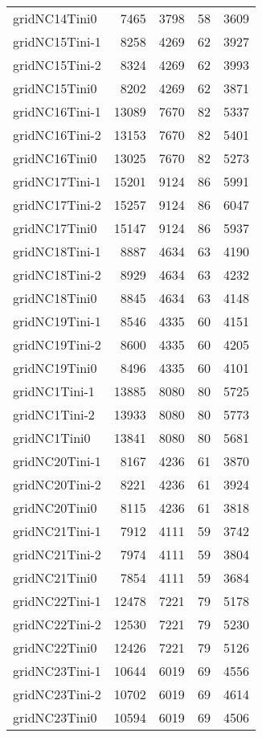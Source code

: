 \documentclass[../../../thesis.tex]{subfiles}
\begin{document}
\begin{longtable}{lrrrr}
gridNC14Tini0 & 7465 & 3798 & 58 & 3609 \\
gridNC15Tini-1 & 8258 & 4269 & 62 & 3927 \\
gridNC15Tini-2 & 8324 & 4269 & 62 & 3993 \\
gridNC15Tini0 & 8202 & 4269 & 62 & 3871 \\
gridNC16Tini-1 & 13089 & 7670 & 82 & 5337 \\
gridNC16Tini-2 & 13153 & 7670 & 82 & 5401 \\
gridNC16Tini0 & 13025 & 7670 & 82 & 5273 \\
gridNC17Tini-1 & 15201 & 9124 & 86 & 5991 \\
gridNC17Tini-2 & 15257 & 9124 & 86 & 6047 \\
gridNC17Tini0 & 15147 & 9124 & 86 & 5937 \\
gridNC18Tini-1 & 8887 & 4634 & 63 & 4190 \\
gridNC18Tini-2 & 8929 & 4634 & 63 & 4232 \\
gridNC18Tini0 & 8845 & 4634 & 63 & 4148 \\
gridNC19Tini-1 & 8546 & 4335 & 60 & 4151 \\
gridNC19Tini-2 & 8600 & 4335 & 60 & 4205 \\
gridNC19Tini0 & 8496 & 4335 & 60 & 4101 \\
gridNC1Tini-1 & 13885 & 8080 & 80 & 5725 \\
gridNC1Tini-2 & 13933 & 8080 & 80 & 5773 \\
gridNC1Tini0 & 13841 & 8080 & 80 & 5681 \\
gridNC20Tini-1 & 8167 & 4236 & 61 & 3870 \\
gridNC20Tini-2 & 8221 & 4236 & 61 & 3924 \\
gridNC20Tini0 & 8115 & 4236 & 61 & 3818 \\
gridNC21Tini-1 & 7912 & 4111 & 59 & 3742 \\
gridNC21Tini-2 & 7974 & 4111 & 59 & 3804 \\
gridNC21Tini0 & 7854 & 4111 & 59 & 3684 \\
gridNC22Tini-1 & 12478 & 7221 & 79 & 5178 \\
gridNC22Tini-2 & 12530 & 7221 & 79 & 5230 \\
gridNC22Tini0 & 12426 & 7221 & 79 & 5126 \\
gridNC23Tini-1 & 10644 & 6019 & 69 & 4556 \\
gridNC23Tini-2 & 10702 & 6019 & 69 & 4614 \\
gridNC23Tini0 & 10594 & 6019 & 69 & 4506 \\

\end{longtable}
\end{document}
